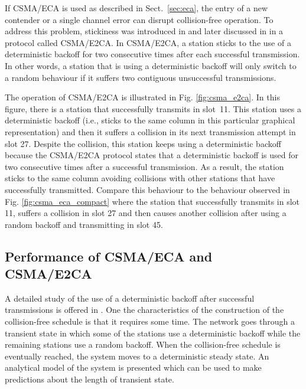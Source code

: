 \documentclass[journal]{IEEEtran}
\begin{document}

If CSMA/ECA is used as described in Sect.~\ref{sec:eca}, the entry of a new contender or a single channel error can disrupt collision-free operation.
To address this problem, stickiness was introduced in \cite{fang2011dlm} and later discussed in \cite{barcelo2011tcf} in a protocol called CSMA/E2CA.
In CSMA/E2CA, a station sticks to the use of a deterministic backoff for two consecutive times after each successful transmission.
In other words, a station that is using a deterministic backoff will only switch to a random behaviour if it suffers two contiguous unsuccessful transmissions.

The operation of CSMA/E2CA is illustrated in Fig. \ref{fig:csma_e2ca}.
In this figure, there is a station that successfully transmits in slot~11.
This station uses a deterministic backoff (i.e., sticks to the same column in this particular graphical representation) and then it suffers a collision in its next transmission attempt in slot 27.
Despite the collision, this station keeps using a deterministic backoff because the CSMA/E2CA protocol states that a deterministic backoff is used for two consecutive times after a successful transmission.
As a result, the station sticks to the same column avoiding collisions with other stations that have successfully transmitted.
Compare this behaviour to the behaviour observed in Fig. \ref{fig:csma_eca_compact} where the station that successfully transmits in slot 11, suffers a collision in slot 27 and then causes another collision after using a random backoff and transmitting in slot 45.

\subsection{Performance of CSMA/ECA and CSMA/E2CA}

A detailed study of the use of a deterministic backoff after successful transmissions is offered in \cite{he2009srb}. 
One the characteristics of the construction of the collision-free schedule is that it requires some time.
The network goes through a transient state in which some of the stations use a deterministic backoff while the remaining stations use a random backoff.
When the collision-free schedule is eventually reached, the system moves to a deterministic steady state.
An analytical model of the system is presented which can be used to make predictions about the length of transient state.
\end{document}

